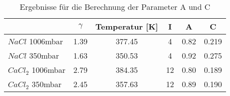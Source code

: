 \begin{enumerate}
\begin{itemize}
		            \begin{table}[H]
			            \centering
			            \begin{tabular}{lccccc}
				            \toprule
				                              & $\gamma$ & Temperatur [K] & I  & A    & C     \\
				            \midrule
				            $NaCl$ 1006mbar   & 1.39     & 377.45         & 4  & 0.82 & 0.219 \\
				            $NaCl$ 350mbar    & 1.63     & 350.53         & 4  & 0.92 & 0.275 \\
				            $CaCl_2$ 1006mbar & 2.79     & 384.35         & 12 & 0.80 & 0.189 \\
				            $CaCl_2$ 350mbar  & 2.45     & 357.63         & 12 & 0.89 & 0.190 \\
				            \bottomrule
			            \end{tabular}
			            \caption{Ergebnisse für die Berechnung der Parameter A und C}
		            \end{table}
	      \end{itemize}
\end{enumerate}